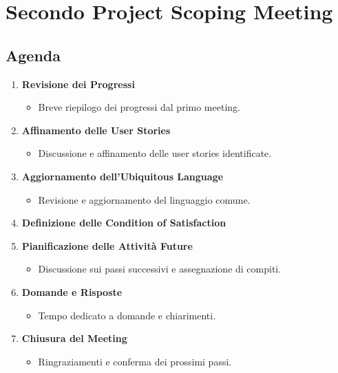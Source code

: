 \section{Secondo Project Scoping Meeting}

\subsection{Agenda}

\begin{enumerate}
    \item \textbf{Revisione dei Progressi}
          \begin{itemize}
              \item Breve riepilogo dei progressi dal primo meeting.
          \end{itemize}

    \item \textbf{Affinamento delle User Stories}
          \begin{itemize}
              \item Discussione e affinamento delle user stories identificate.
          \end{itemize}

    \item \textbf{Aggiornamento dell'Ubiquitous Language}
          \begin{itemize}
              \item Revisione e aggiornamento del linguaggio comune.
          \end{itemize}

    \item \textbf{Definizione delle Condition of Satisfaction}

    \item \textbf{Pianificazione delle Attività Future}
          \begin{itemize}
              \item Discussione sui passi successivi e assegnazione di compiti.
          \end{itemize}

    \item \textbf{Domande e Risposte}
          \begin{itemize}
              \item Tempo dedicato a domande e chiarimenti.
          \end{itemize}

    \item \textbf{Chiusura del Meeting}
          \begin{itemize}
              \item Ringraziamenti e conferma dei prossimi passi.
          \end{itemize}
\end{enumerate}

